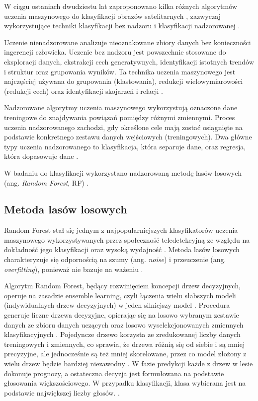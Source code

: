\documentclass{amuthesis}
\begin{document}
W ciągu ostaniach dwudziestu lat zaproponowano kilka różnych algorytmów
uczenia maszynowego do klasyfikacji obrazów satelitarnych
\autocite{sheykhmousa_2020_svm_vs_rf}, zazwyczaj wykorzystujące techniki
klasyfikacji bez nadzoru i klasyfikacji nadzorowanej
\autocite{ismail_2009_classification}.

Uczenie nienadzorowane analizuje nieoznakowane zbiory danych bez
konieczności ingerencji człowieka. Uczenie bez nadzoru jest powszechnie
stosowane do eksploracji danych, ekstrakcji cech generatywnych,
identyfikacji istotnych trendów i struktur oraz grupowania wyników. Ta
technika uczenia maszynowego jest najczęściej używana do grupowania
(klastowania), redukcji wielowymiarowości (redukcji cech) oraz
identyfikacji skojarzeń i relacji \autocite{sarker_2021_ml}.

Nadzorowane algorytmy uczenia maszynowego wykorzystują oznaczone dane
treningowe do znajdywania powiązań pomiędzy różnymi zmiennymi. Proces
uczenia nadzorowanego zachodzi, gdy określone cele mają zostać
osiągnięte na podstawie konkretnego zestawu danych wejściowych
(treningowych). Dwa główne typy uczenia nadzorowanego to klasyfikacja,
która separuje dane, oraz regresja, która dopasowuje dane
\autocite{sarker_2021_ml}.

W badaniu do klasyfikacji wykorzystano nadzorowaną metodę lasów losowych
(ang. \emph{Random Forest}, RF) \autocite{breiman_2001_rf}.

\hypertarget{sec-random-forest}{%
\subsection{Metoda lasów losowych}\label{sec-random-forest}}

Random Forest stał się jednym z najpopularniejszych klasyfikatorów
uczenia maszynowego wykorzystywanych przez społeczność teledetekcyjną ze
względu na dokładność jego klasyfikacji oraz wysoką wydajność
\autocite{belgiu_2016_rf,sheykhmousa_2020_svm_vs_rf}. Metoda lasów
losowych charakteryzuje się odpornością na szumy (ang. \emph{noise}) i
przeuczenie (ang. \emph{overfitting}), ponieważ nie bazuje na ważeniu
\autocite{gislason_2006_rf}.

Algorytm Random Forest, będący rozwinięciem koncepcji drzew decyzyjnych,
operuje na zasadzie ensemble learning, czyli łączenia wielu słabszych
modeli (indywidualnych drzew decyzyjnych) w jeden silniejszy model
\autocite{aaron_2018_ml,sekulic_2020_rf_interpolation}. Procedura
generuje liczne drzewa decyzyjne, opierając się na losowo wybranym
zestawie danych ze zbioru danych uczących oraz losowo wyselekcjonowanych
zmiennych klasyfikacyjnych \autocite{breiman_2001_rf}. Pojedyncze drzewo
korzysta ze zredukowanej liczby danych treningowych i zmiennych, co
sprawia, że drzewa różnią się od siebie i są mniej precyzyjne, ale
jednocześnie są też mniej skorelowane, przez co model złożony z wielu
drzew będzie bardziej niezawodny
\autocite{sekulic_2020_rf_interpolation}. W fazie predykcji każde z
drzew w lesie dokonuje prognozy, a ostateczna decyzja jest formułowana
na podstawie głosowania większościowego. W przypadku klasyfikacji, klasa
wybierana jest na podstawie największej liczby głosów.
\autocite{malinowski_2020_s2lulc}.
\end{document}
